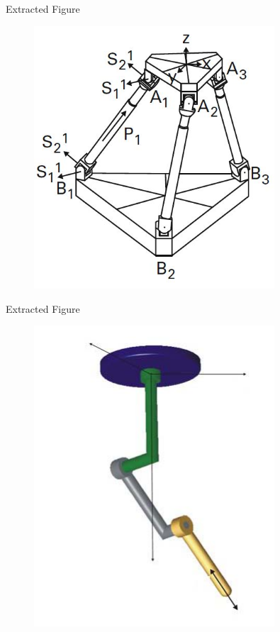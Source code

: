 \documentclass{beamer}
\begin{document}
\begin{frame}{Extracted Figure}
    \centering
    \begin{figure}
        \includegraphics[width=0.8\textwidth]{extracted_images/figure_2_1.png}  %
    \end{figure}
\end{frame}

\begin{frame}{Extracted Figure}
    \centering
    \begin{figure}
        \includegraphics[width=0.8\textwidth]{extracted_images/figure_4_1.png}  %
    \end{figure}
\end{frame}
\end{document}
